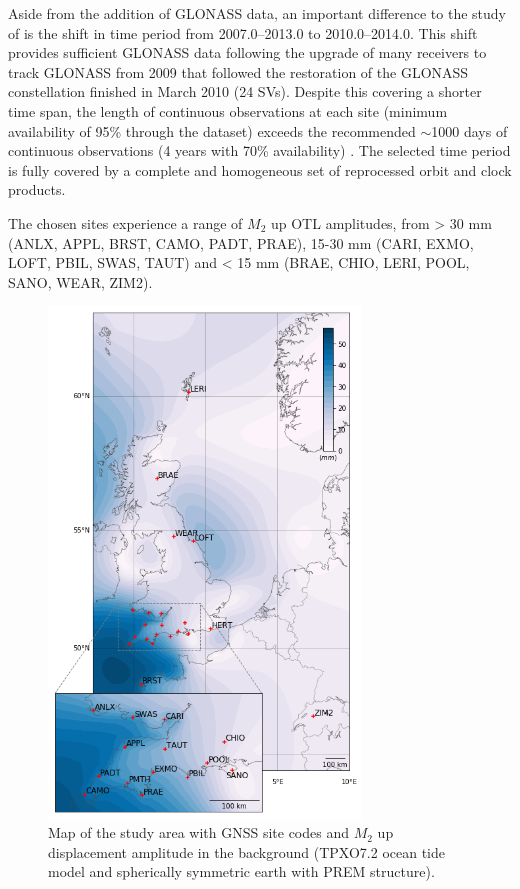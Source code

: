 \documentclass[se, manuscript]{copernicus}
\begin{document}
Aside from the addition of GLONASS data, an important difference to the study of \cite{Penna2015} is the shift in time period from 2007.0–2013.0 to 2010.0–2014.0. This shift provides sufficient GLONASS data following the upgrade of many receivers to track GLONASS from 2009 that followed the restoration of the GLONASS constellation finished in March 2010 (24 SVs). Despite this covering a shorter time span, the length of continuous observations at each site (minimum availability of 95\% through the dataset) exceeds the recommended $\sim$1000 days of continuous observations (4 years with 70\% availability) \citep{Penna2015}. The selected time period is fully covered by a complete and homogeneous set of reprocessed orbit and clock products.

The chosen sites experience a range of $M_2$ up OTL amplitudes, from > 30 mm (ANLX, APPL, BRST, CAMO, PADT, PRAE), 15-30 mm (CARI, EXMO, LOFT, PBIL, SWAS, TAUT) and < 15 mm (BRAE, CHIO, LERI, POOL, SANO, WEAR, ZIM2).

\begin{figure}[t]
\includegraphics[width=8.3cm]{fig01_updated.png}
\caption{Map of the study area with GNSS site codes and $M_2$ up displacement amplitude in the background (TPXO7.2 ocean tide model and spherically symmetric earth with PREM structure).}
\end{figure}
\end{document}
